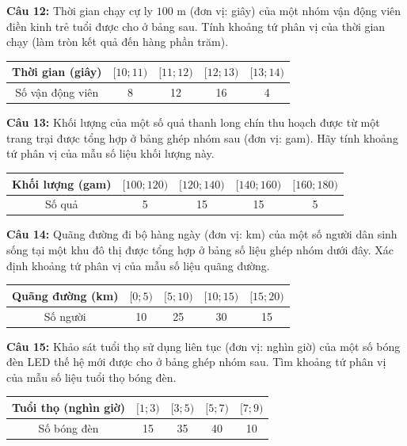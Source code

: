 \documentclass[12pt]{article}
\begin{document}
	\noindent \textbf{Câu 12:} Thời gian chạy cự ly $100\text{ m}$ (đơn vị: giây) của một nhóm vận động viên điền kinh trẻ tuổi được cho ở bảng sau. Tính khoảng tứ phân vị của thời gian chạy (làm tròn kết quả đến hàng phần trăm).
	\begin{center}
		\renewcommand{\arraystretch}{1.3}
		\begin{tabular}{|c|c|c|c|c|}
			\hline
			Thời gian (giây) & $[10; 11)$ & $[11; 12)$ & $[12; 13)$ & $[13; 14)$ \\
			\hline
			Số vận động viên & 8 & 12 & 16 & 4 \\
			\hline
		\end{tabular}
	\end{center}
	
	\vspace{4mm}
	
	\noindent \textbf{Câu 13:} Khối lượng của một số quả thanh long chín thu hoạch được từ một trang trại được tổng hợp ở bảng ghép nhóm sau (đơn vị: gam). Hãy tính khoảng tứ phân vị của mẫu số liệu khối lượng này.
	\begin{center}
		\renewcommand{\arraystretch}{1.3}
		\begin{tabular}{|c|c|c|c|c|}
			\hline
			Khối lượng (gam) & $[100; 120)$ & $[120; 140)$ & $[140; 160)$ & $[160; 180)$ \\
			\hline
			Số quả & 5 & 15 & 15 & 5 \\
			\hline
		\end{tabular}
	\end{center}
	
	\vspace{4mm}
	
	\noindent \textbf{Câu 14:} Quãng đường đi bộ hàng ngày (đơn vị: km) của một số người dân sinh sống tại một khu đô thị được tổng hợp ở bảng số liệu ghép nhóm dưới đây. Xác định khoảng tứ phân vị của mẫu số liệu quãng đường.
	\begin{center}
		\renewcommand{\arraystretch}{1.3}
		\begin{tabular}{|c|c|c|c|c|}
			\hline
			Quãng đường (km) & $[0; 5)$ & $[5; 10)$ & $[10; 15)$ & $[15; 20)$ \\
			\hline
			Số người & 10 & 25 & 30 & 15 \\
			\hline
		\end{tabular}
	\end{center}
	
	\vspace{4mm}
	
	\noindent \textbf{Câu 15:} Khảo sát tuổi thọ sử dụng liên tục (đơn vị: nghìn giờ) của một số bóng đèn LED thế hệ mới được cho ở bảng ghép nhóm sau. Tìm khoảng tứ phân vị của mẫu số liệu tuổi thọ bóng đèn.
	\begin{center}
		\renewcommand{\arraystretch}{1.3}
		\begin{tabular}{|c|c|c|c|c|}
			\hline
			Tuổi thọ (nghìn giờ) & $[1; 3)$ & $[3; 5)$ & $[5; 7)$ & $[7; 9)$ \\
			\hline
			Số bóng đèn & 15 & 35 & 40 & 10 \\
			\hline
		\end{tabular}
	\end{center}
	
\end{document}
